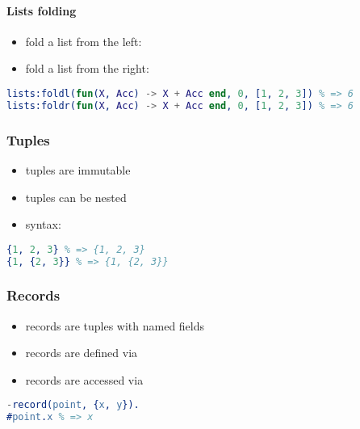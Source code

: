 \documentclass[a4paper,landscape,10pt]{article}
\begin{document}
\begin{multicols*}{2}
  \paragraph{Lists folding}

  \begin{itemize}
    \item fold a list from the left: 
    \item fold a list from the right: 
  \end{itemize}

  \begin{lstlisting}[language=Erlang]
lists:foldl(fun(X, Acc) -> X + Acc end, 0, [1, 2, 3]) % => 6
lists:foldr(fun(X, Acc) -> X + Acc end, 0, [1, 2, 3]) % => 6
\end{lstlisting}

  \subsubsection{Tuples}

  \begin{itemize}
    \item tuples are immutable
    \item tuples can be nested
    \item syntax: 
  \end{itemize}

  \begin{lstlisting}[language=Erlang]
{1, 2, 3} % => {1, 2, 3}
{1, {2, 3}} % => {1, {2, 3}}
\end{lstlisting}

  \breakcolumn

  \subsubsection{Records}

  \begin{itemize}
    \item records are tuples with named fields
    \item records are defined via 
    \item records are accessed via 
  \end{itemize}

  \begin{lstlisting}[language=Erlang]
-record(point, {x, y}).
#point.x % => x
\end{lstlisting}


\end{multicols*}
\end{document}
